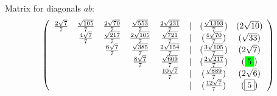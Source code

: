 \documentclass[11pt]{article}
\begin{document}
Matrix for diagonals $ab$:
\begin{equation}\label{eq:appendrow}
\left(\begin{array}{cccccccc}
	\frac{2\sqrt7}7 & \frac{\sqrt{105}}7 & \frac{2\sqrt{70}}7 & \frac{\sqrt{553}}7 & \frac{2\sqrt{231}}7 & | &  (\frac{\sqrt{1393}}7) & (2\sqrt{10}) \\
	 & \frac{4\sqrt7}7 & \frac{\sqrt{217}}7 & \frac{2\sqrt{105}}7 & \frac{\sqrt{721}}7 & | &  (\frac{4\sqrt{70}}7) & (\sqrt{33}) \\
	 & & \frac{6\sqrt7}7 & \frac{\sqrt{385}}7 & \frac{2\sqrt{154}}7 & | &  (\frac{3\sqrt{105}}7) & (2\sqrt{7}) \\
	 & & & \frac{8\sqrt7}7 & \frac{\sqrt{609}}7 & | &  (\frac{2\sqrt{217}}7) & (\five) \\
	 & & & & \frac{10\sqrt7}7 & | &  (\frac{\sqrt{889}}7) & (2\sqrt{6}) \\
	 & & & & & | & (\frac{12\sqrt7}7) & (\boxed{5}) \\
\end{array}\right)
\end{equation}
\end{document}
